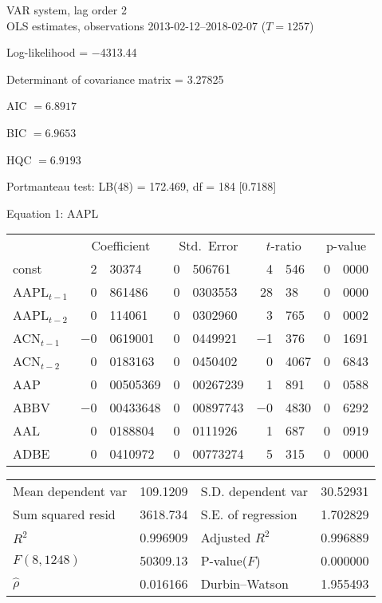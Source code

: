 \documentclass[11pt]{article}
\begin{document}
\thispagestyle{empty}

\begin{center}
VAR system, lag order 2\\
OLS estimates, observations 2013-02-12--2018-02-07 ($T=1257$)
\end{center}
\noindent
Log-likelihood = $-$4313.44\par
\noindent
Determinant of covariance matrix = 3.27825\par
\noindent
AIC $= 6.8917$ \par
\noindent
BIC $= 6.9653$ \par
\noindent
HQC $= 6.9193$ \par
\noindent
Portmanteau test: LB(48) = 172.469, df = 184 [0.7188]\par
\begin{center}

Equation 1: AAPL\\

\vspace{1em}

\begin{tabular}{lr@{.}lr@{.}lr@{.}lr@{.}l}
  &
 \multicolumn{2}{c}{Coefficient} &
  \multicolumn{2}{c}{Std.\ Error} &
   \multicolumn{2}{c}{$t$-ratio} &
    \multicolumn{2}{c}{p-value} \\[1ex]
const &
  2&30374 &
    0&506761 &
      4&546 &
        0&0000 \\
AAPL$_{t-1}$ &
  0&861486 &
    0&0303553 &
      28&38 &
        0&0000 \\
AAPL$_{t-2}$ &
  0&114061 &
    0&0302960 &
      3&765 &
        0&0002 \\
ACN$_{t-1}$ &
  $-$0&0619001 &
    0&0449921 &
      $-$1&376 &
        0&1691 \\
ACN$_{t-2}$ &
  0&0183163 &
    0&0450402 &
      0&4067 &
        0&6843 \\
AAP &
  0&00505369 &
    0&00267239 &
      1&891 &
        0&0588 \\
ABBV &
  $-$0&00433648 &
    0&00897743 &
      $-$0&4830 &
        0&6292 \\
AAL &
  0&0188804 &
    0&0111926 &
      1&687 &
        0&0919 \\
ADBE &
  0&0410972 &
    0&00773274 &
      5&315 &
        0&0000 \\
\end{tabular}

\vspace{1ex}
\begin{tabular}{lrlr}
Mean dependent var &  109.1209 & S.D. dependent var &  30.52931 \\
Sum squared resid &  3618.734 & S.E. of regression &  1.702829 \\
$R^2$ &  0.996909 & Adjusted $R^2$ &  0.996889 \\
$F(8, 1248)$ &  50309.13 & P-value($F$) &  0.000000 \\
$\hat{\rho}$ &  0.016166 & Durbin--Watson &  1.955493 \\
\end{tabular}


\end{center}
\end{document}
